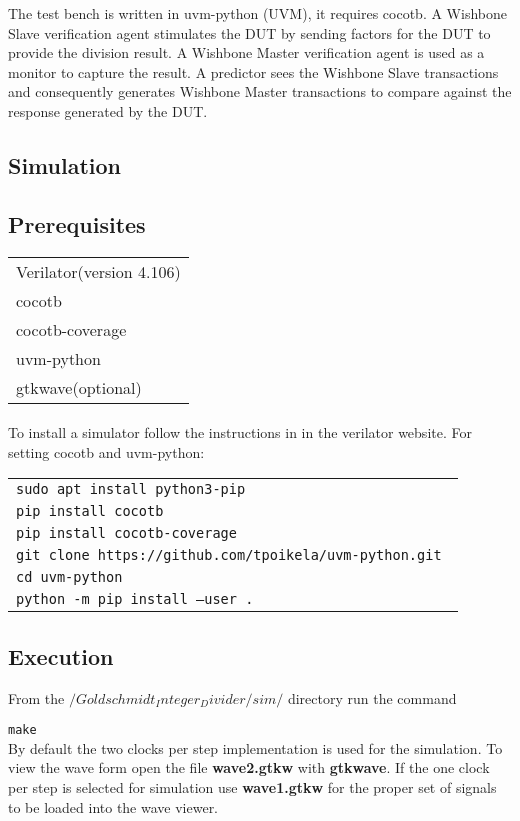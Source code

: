 \documentclass[letterpaper]{article}
\begin{document}
	The test bench is written in uvm-python (UVM), it requires cocotb. A Wishbone Slave verification agent stimulates the DUT by sending factors for the DUT to provide the division result. A Wishbone Master verification agent is used as a monitor to capture the result. A predictor sees the Wishbone Slave transactions and consequently generates Wishbone Master transactions to compare against the response generated by the DUT.
	
	\subsection{Simulation}
	
	\subsection{Prerequisites}
	
	
	\begin{tabular}{l}
	    Verilator(version 4.106) \\
	    cocotb \\
	    cocotb-coverage \\
	    uvm-python \\
	    gtkwave(optional)\\
    \end{tabular}
	
	\paragraph{}To install a simulator follow the instructions in in the verilator website.
	For setting cocotb and uvm-python: 
	
	\begin{tabular}{l}
	    {\tt sudo apt install python3-pip } \\
	    {\tt pip install cocotb } \\
	    {\tt pip install cocotb-coverage } \\
	    {\tt git clone https://github.com/tpoikela/uvm-python.git } \\
	    {\tt cd uvm-python } \\
	    {\tt python -m pip install --user . } \\
    \end{tabular}
	
	
	\subsection{Execution}
	
	From the $/Goldschmidt_Integer_Divider/sim/$ directory run the command
	
	{\tt make}\\
	
	By default the two clocks per step implementation is used for the simulation. To view the wave form open the file \textbf{wave2.gtkw} with \textbf{gtkwave}. If the one clock per step is selected for simulation use \textbf{wave1.gtkw} for the proper set of signals to be loaded into the wave viewer.
\end{document}
